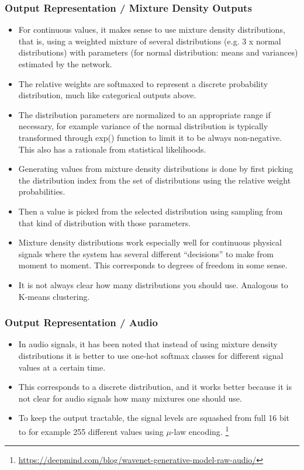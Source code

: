 \documentclass[8pt]{beamer}
\begin{document}
\begin{frame}
\frametitle{Output Representation / Mixture Density Outputs}
 \begin{itemize}
  \item For continuous values, it makes sense to use mixture density distributions, that is, using a weighted mixture of several distributions (e.g. 3 x normal distributions) with
        parameters (for normal distribution: means and variances) estimated by the network.
  \item The relative weights are softmaxed to represent a discrete probability distribution, much like categorical outputs above.
  \item The distribution parameters are normalized to an appropriate range if necessary, for example variance of the normal distribution
        is typically transformed through exp() function to
        limit it to be always non-negative. This also has a rationale from statistical likelihoods.
  \item Generating values from mixture density distributions is done by first picking the distribution index from the set of distributions using the relative weight probabilities.
  \item Then a value is picked from the selected distribution using sampling from that kind of distribution with those parameters.
  \item Mixture density distributions work especially well for continuous physical signals where the system has several different ``decisions''
        to make from moment to moment. This corresponds to degrees of freedom in some sense.
  \item It is not always clear how many distributions you should use. Analogous to K-means clustering.
 \end{itemize}
\end{frame}

\begin{frame}
\frametitle{Output Representation / Audio}
 \begin{itemize}
  \item In audio signals, it has been noted that instead of using mixture density distributions it is better to use one-hot softmax classes for different
        signal values at a certain time.
  \item This corresponds to a discrete distribution, and it works better because it is not clear for audio signals how many mixtures one should use.
  \item To keep the output tractable, the signal levels are squashed from full 16 bit to for example 255 different values using $\mu$-law encoding.
        \footnote{\href{https://deepmind.com/blog/wavenet-generative-model-raw-audio/}
                       {https://deepmind.com/blog/wavenet-generative-model-raw-audio/}}
 \end{itemize}
\end{frame}
\end{document}
